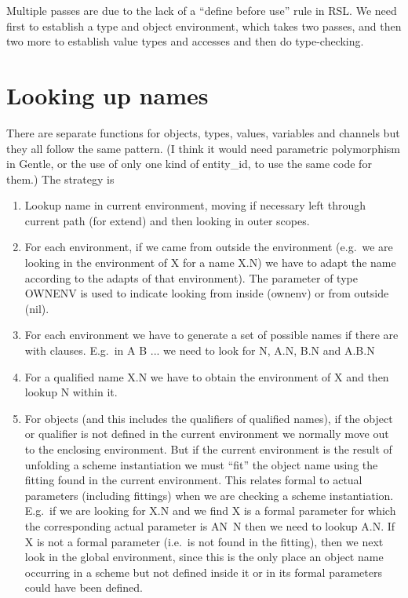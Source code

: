 \documentclass[a4paper]{article}
\begin{document}
Multiple passes are due to the lack of a ``define before use'' rule in
RSL.  We need first to establish a type and object environment, which
takes two passes, and then two more to establish value types and
accesses and then do type-checking.


\section{Looking up names}
\label{sec:lookup}

There are separate functions for objects, types, values, variables and
channels but they all follow the same pattern.  (I think it would need
parametric polymorphism in Gentle, or the use of only one kind of
entity\_id, to use the same code for them.)  The strategy is

\begin{enumerate}
\item Lookup name in current environment, moving if necessary left through current
  path (for extend) and then looking in outer scopes.
\item For each environment, if we came from outside the environment
  (e.g.\ we are looking in the environment of X for a name X.N) we
  have to adapt the name according to the adapts of that
  environment).  The parameter of type OWNENV is used to indicate
  looking from inside (ownenv) or from outside (nil).
\item For each environment we have to generate a set of possible names
  if there are with clauses.  E.g.\ in  A  B ... we
  need to look for N, A.N, B.N and A.B.N
\item For a qualified name X.N we have to obtain the environment of X
  and then lookup N within it.
\item For objects (and this includes the qualifiers of qualified
  names), if the object or qualifier is not defined in the current
  environment we normally move out to the enclosing environment.  But
  if the current environment is the result of unfolding a scheme
  instantiation we must ``fit'' the object name using the fitting
  found in the current environment.  This relates formal to actual
  parameters (including fittings) when we are checking a scheme
  instantiation.  E.g.\ if we are looking for X.N and we find X is a
  formal parameter for which the corresponding actual parameter is
  \mbox{A{\LBRACE}N{\PRIM}  N{\RBRACE}} then we need to lookup
  A.N{\PRIM}.  If X is not a formal parameter (i.e.\ is not found in
  the fitting), then we next look in the global environment, since this
  is the only place an object name occurring in a scheme but not
  defined inside it or in its formal parameters could have been
  defined.
\end{enumerate}
\end{document}
